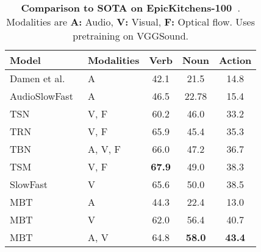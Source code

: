 \begin{table}
            \begin{tabular}{llccc}
                \toprule 
                Model & Modalities & Verb & Noun & Action \\
                \midrule 
                Damen et al.~\cite{damen2020rescaling} & A & 42.1 & 21.5 & 14.8 \\
                AudioSlowFast~\cite{kazakos2021slow} & A & 46.5 & 22.78 & 15.4 \\
                TSN~\cite{wang2016temporal}  & V, F & 60.2 & 46.0 & 33.2  \\
                TRN~\cite{zhou2018temporal} & V, F & 65.9 & 45.4 & 35.3 \\
                TBN~\cite{kazakos2019epic} & A, V, F &   66.0 & 47.2 & 36.7 \\
                TSM~\cite{lin2019temporal} & V, F &  \textbf{67.9} & 49.0 & 38.3 \\ 
                SlowFast~\cite{feichtenhofer2019slowfast} & V & 65.6 & 50.0 & 38.5 \\ 
                \hdashline
                MBT  & A &  44.3 & 22.4 & 13.0\\
                MBT & V & 62.0  & 56.4 & 40.7\\
                MBT & A, V & 64.8 & \textbf{58.0} & \textbf{43.4}\\
                \bottomrule 
            \end{tabular}
        \caption{\textbf{Comparison to SOTA on EpicKitchens-100~\cite{damen2020rescaling}}. Modalities are \textbf{A:} Audio, \textbf{V:} Visual, \textbf{F:} Optical flow. Uses pretraining on VGGSound.}
        \label{tab:epickitchens-sota}
    \end{table}

